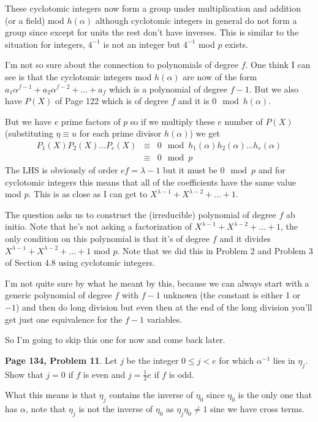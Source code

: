 \documentclass[aps,preprint,preprintnumbers,nofootinbib,showpacs,prd]{revtex4-1}
\newcommand{\nbea}{\begin{eqnarray*}}
\newcommand{\neea}{\end{eqnarray*}}
\begin{document}
These cyclotomic integers now form a group under multiplication and addition (or a field) mod $h(\alpha)$ although cyclotomic integers in general do not form a group since except for units the rest don't have inverses. This is similar to the situation for integers, $4^{-1}$ is not an integer but $4^{-1}$ mod $p$ exists.

I'm not so sure about the connection to polynomials of degree $f$. One think I can see is that the cyclotomic integers mod $h(\alpha)$ are now of the form $a_1\alpha^{f-1} + a_2\alpha^{f-2} + \dots + a_f$ which is a polynomial of degree $f - 1$. But we also have $P(X)$ of Page 122 which is of degree $f$ and it is $0 \mod{h(\alpha)}$.

But we have $e$ prime factors of $p$ so if we multiply these $e$ number of $P(X)$ (substituting $\eta \equiv u$ for each prime divisor $h(\alpha)$) we get 
%
\nbea
P_1(X)P_2(X) \dots P_e(X) & \equiv & 0 \mod h_1(\alpha)h_2(\alpha) \dots h_e(\alpha) \\
& \equiv & 0 \mod p
\neea
%
The LHS is obviously of order $ef = \lambda - 1$ but it must be $0 \mod p$ and for cyclotomic integers this means that all of the coefficients have the same value mod $p$. This is as close as I can get to $X^{\lambda-1} + X^{\lambda - 2} + \dots + 1$.

The question asks us to construct the (irreducible) polynomial of degree $f$ ab initio. Note that he's not asking a factorization of $X^{\lambda-1} + X^{\lambda - 2} + \dots + 1$, the only condition on this polynomial is that it's of degree $f$ and it divides $X^{\lambda-1} + X^{\lambda - 2} + \dots + 1$ mod $p$. Note that we did this in Problem 2 and Problem 3 of Section 4.8 using cyclotomic integers.

I'm not quite sure by what he meant by this, because we can always start with a generic polynomial of degree $f$ with $f - 1$ unknown (the constant is either 1 or $-1$) and then do long division but even then at the end of the long division you'll get just one equivalence for the $f - 1$ variables.

So I'm going to skip this one for now and come back later.



{\bf Page 134, Problem 11}. Let $j$ be the integer $0 \le j < e$ for which $\alpha^{-1}$ lies in $\eta_j$. Show that $j=0$ if $f$ is even and $j = \frac{1}{2} e$ if $f$ is odd.

What this means is that $\eta_j$ contains the inverse of $\eta_0$ since $\eta_0$ is the only one that has $\alpha$, note that $\eta_j$ is not the inverse of $\eta_0$ as $\eta_j\eta_0 \neq 1$ sine we have cross terms.
\end{document}
